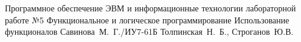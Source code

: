 \documentclass{bmstu}
\begin{document}
	
	{Программное обеспечение ЭВМ и информационные технологии}
	{лабораторной работе №5}
	{Функциональное и логическое программирование}
	{Использование функционалов}
	{}
	{Савинова~М.~Г./ИУ7-61Б}
	{Толпинская~Н.~Б., Строганов~Ю.В.}
	
	\maketableofcontents
	
	
	
	
\end{document}
